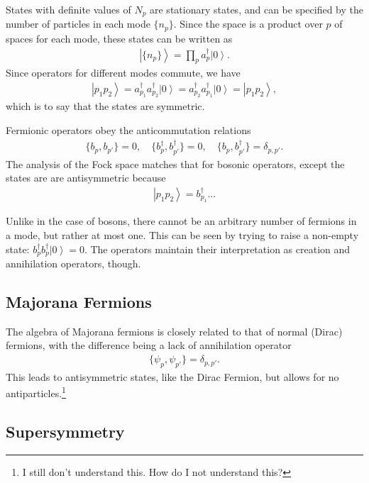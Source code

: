 \documentclass[12pt]{article} %
\newcommand{\ket}[1]{\left|#1\right\rangle}
\begin{document}
States with definite values of $N_p$ are stationary states, and can be specified by the number of particles in each mode $\{n_p\}$. Since the space is a product over $p$ of spaces for each mode, these states can be written as
\begin{align}
\ket{\{n_p\}} = \prod_pa_p^\dag\ket{0}.
\end{align}
Since operators for different modes commute, we have
\begin{align}
\ket{p_1p_2} = a^\dag_{p_1}a^\dag_{p_2}\ket{0} = a^\dag_{p_2} a^\dag_{p_1} \ket{0} = \ket{p_1p_2},
\end{align}
which is to say that the states are symmetric.

Fermionic operators obey the anticommutation relations
\begin{align}
\{b_p, b_{p'}\} = 0,\quad \{b^\dag_p, b^\dag_{p'}\} = 0,\quad \{b_p, b^\dag_{p'}\} = \delta_{p,p'}.
\end{align}
The analysis of the Fock space matches that for bosonic operators, except the states are are antisymmetric because
\begin{align}
\ket{p_1p_2} = b^\dag_{p_1}...
\end{align}

Unlike in the case of bosons, there cannot be an arbitrary number of fermions in a mode, but rather at most one. This can be seen by trying to raise a non-empty state: $b_p^\dag b^\dag_p\ket{0} = 0$. The operators maintain their interpretation as creation and annihilation operators, though.

\subsection{Majorana Fermions} \emph{}

The algebra of Majorana fermions is closely related to that of normal (Dirac) fermions, with the difference being a lack of annihilation operator
\begin{align}
\{\psi_p,\psi_{p'}\} = \delta_{p,p'}.
\end{align}
This leads to antisymmetric states, like the Dirac Fermion, but allows for no antiparticles.\footnote{I still don't understand this. How do I not understand this?}

\subsection{Supersymmetry} \emph{}
\end{document}
